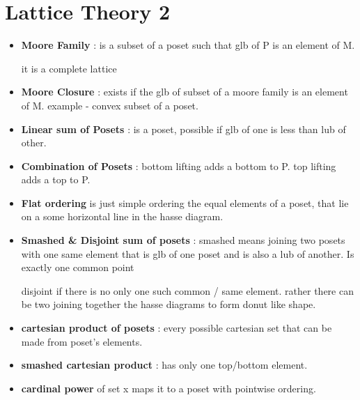 \chapter{Lattice Theory 2}


\begin{itemize}
	\item{\textbf{Moore Family} : is a subset of a poset such that glb of P is an element of M.

	it is a complete lattice
	}

	\item{\textbf{Moore Closure} : exists if the glb of subset of a moore family is an element of M.
	example - convex subset of a poset.

	}

	\item{\textbf{Linear sum of Posets} : is a poset, possible if glb of one is less than lub of other.
	}

	\item{\textbf{Combination of Posets} : bottom lifting adds a bottom to P. top lifting adds a top to P.
	}

	\item{\textbf{Flat ordering} is just simple ordering the equal elements of a poset, that lie on a some horizontal line in the hasse diagram.
	}

	\item{\textbf{Smashed \& Disjoint sum of posets} : 
	smashed means joining two posets with one same element that is glb of one poset and is also a lub of another. Is exactly one common point

	disjoint if there is no only one such common / same element. rather there can be two joining together the hasse diagrams to form donut like shape.
	}

	\item{\textbf{cartesian product of posets} : every possible cartesian set that can be made from poset's elements.
	}

	\item{\textbf{smashed cartesian product} : has only one top/bottom element. }

	\item{\textbf{cardinal power} of set x maps it to a poset with pointwise ordering. }

\end{itemize}